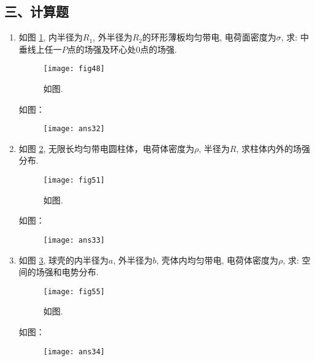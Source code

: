 \subsection*{三、计算题}
\begin{enumerate}
    \item 如图 \ref{Fig:48}, 内半径为$R_1$, 外半径为$R_2$的环形薄板均匀带电, 电荷面密度为$\sigma$, 求: 中垂线上任一$P$点的场强及环心处0点的场强.
    \begin{figure}[H]
        \centering
        \texttt{[image: fig48]}
        \caption{如图.}\label{Fig:48}
    \end{figure}
    \begin{solution}
        如图：
        \begin{figure}[H]
            \centering
            \texttt{[image: ans32]}
        \end{figure}
    \end{solution}
    \item 如图 \ref{Fig:51}, 无限长均匀带电圆柱体，电荷体密度为$\rho$, 半径为$R$, 求柱体内外的场强分布.
    \begin{figure}[H]
        \centering
        \texttt{[image: fig51]}
        \caption{如图.}\label{Fig:51}
    \end{figure}
    \begin{solution}
        如图：
        \begin{figure}[H]
            \centering
            \texttt{[image: ans33]}
        \end{figure}
    \end{solution}
    \item 如图 \ref{Fig:55}, 球壳的内半径为$a$, 外半径为$b$, 壳体内均匀带电, 电荷体密度为$\rho$, 求: 空间的场强和电势分布.
    \begin{figure}[H]
        \centering
        \texttt{[image: fig55]}
        \caption{如图.}\label{Fig:55}
    \end{figure}
    \begin{solution}
        如图：
        \begin{figure}[H]
            \centering
            \texttt{[image: ans34]}
        \end{figure}
    \end{solution}
\end{enumerate}